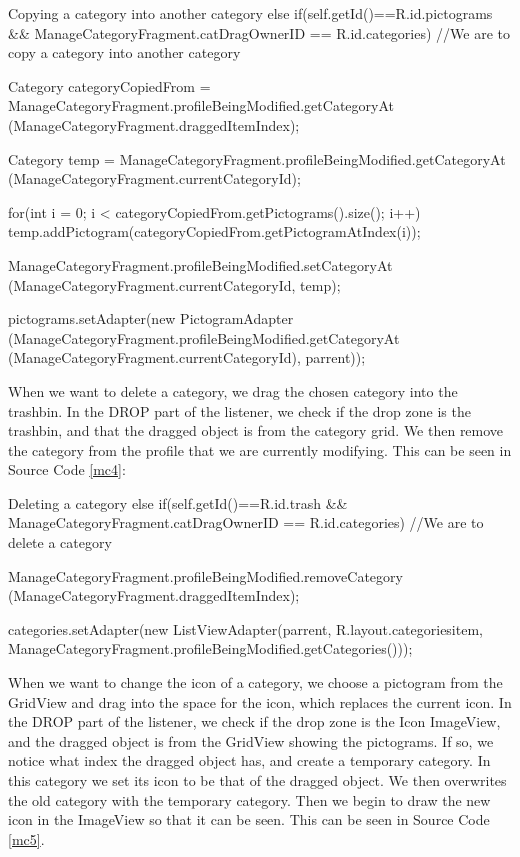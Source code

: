 \begin{source}[{mc3}]{Copying a category into another category}
else if(self.getId()==R.id.pictograms && ManageCategoryFragment.catDragOwnerID == R.id.categories) //We are to copy a category into another category
				{	
					
					Category categoryCopiedFrom = ManageCategoryFragment.profileBeingModified.getCategoryAt
						(ManageCategoryFragment.draggedItemIndex); 
					
					Category temp = ManageCategoryFragment.profileBeingModified.getCategoryAt
						(ManageCategoryFragment.currentCategoryId);
					
					for(int i = 0; i < categoryCopiedFrom.getPictograms().size(); i++)
					{
						temp.addPictogram(categoryCopiedFrom.getPictogramAtIndex(i)); 
					}
					
					ManageCategoryFragment.profileBeingModified.setCategoryAt
						(ManageCategoryFragment.currentCategoryId, temp);
					
					pictograms.setAdapter(new PictogramAdapter
						(ManageCategoryFragment.profileBeingModified.getCategoryAt
						(ManageCategoryFragment.currentCategoryId), parrent));
				}
\end{source}
When we want to delete a category, we drag the chosen category into the trashbin. 
In the DROP part of the listener, we check if the drop zone is the trashbin, and that the dragged object is from the category grid. 
We then remove the category from the profile that we are currently modifying. 
This can be seen in Source Code \ref{mc4}:

\begin{source}[{mc4}]{Deleting a category}
else if(self.getId()==R.id.trash && ManageCategoryFragment.catDragOwnerID == R.id.categories) //We are to delete a category
				{	
					ManageCategoryFragment.profileBeingModified.removeCategory
						(ManageCategoryFragment.draggedItemIndex);
					
					categories.setAdapter(new ListViewAdapter(parrent, R.layout.categoriesitem,
						ManageCategoryFragment.profileBeingModified.getCategories()));
				}
\end{source}
When we want to change the icon of a category, we choose a pictogram from the GridView and drag into the space for the icon, which replaces the current icon. 
In the DROP part of the listener, we check if the drop zone is the Icon ImageView, and the dragged object is from the GridView showing the pictograms. 
If so, we notice what index the dragged object has, and create a temporary category. 
In this category we set its icon to be that of the dragged object.  
We then overwrites the old category with the temporary category.
Then we begin to draw the new icon in the ImageView so that it can be seen. 
This can be seen in Source Code \ref{mc5}.

